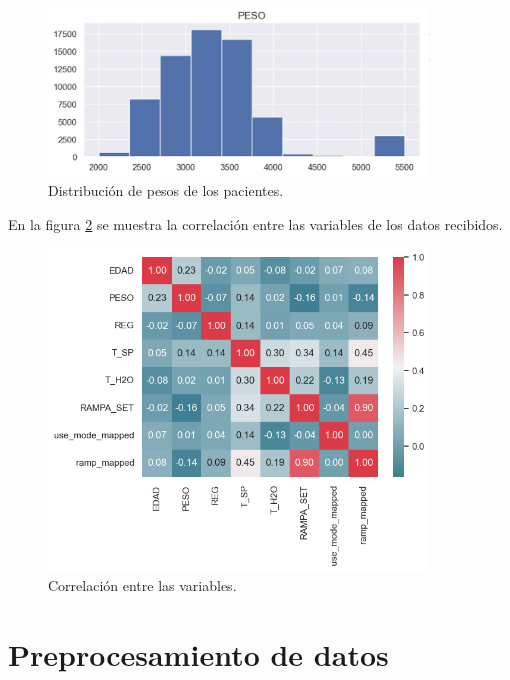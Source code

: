 \begin{figure}[htbp]
	\centering
	\includegraphics[width=0.9\textwidth]{./Figures/dist_peso.png}
	\caption{Distribución de pesos de los pacientes.}
	\label{fig:peso}
\end{figure}

En la figura \ref{fig:corr} se muestra la correlación entre las variables de los datos recibidos.
\begin{figure}[htbp]
	\centering
	\includegraphics[width=0.9\textwidth]{./Figures/correlation.png}
	\caption{Correlación entre las variables.}
	\label{fig:corr}
\end{figure}

\section{Preprocesamiento de datos}
